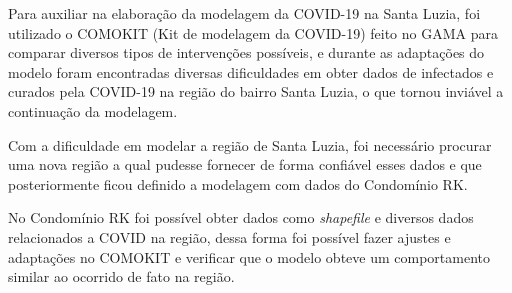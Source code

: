 Para auxiliar na elaboração da modelagem da COVID-19 na Santa Luzia, foi utilizado o COMOKIT (Kit de modelagem da COVID-19) feito no GAMA para comparar diversos tipos de intervenções possíveis, e durante as adaptações do modelo foram encontradas diversas dificuldades em obter dados de infectados e curados pela COVID-19 na região do bairro Santa Luzia, o que tornou inviável a continuação da modelagem.

Com a dificuldade em modelar a região de Santa Luzia, foi necessário procurar uma nova região a qual pudesse fornecer de forma confiável esses dados e que posteriormente ficou definido a modelagem com dados do Condomínio RK.

No Condomínio RK foi possível obter dados como \textit{shapefile} e diversos dados relacionados a COVID na região, dessa forma foi possível fazer ajustes e adaptações no COMOKIT e verificar que o modelo obteve um comportamento similar ao ocorrido de fato na região.






